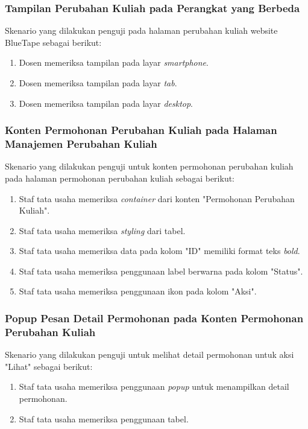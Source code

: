 \subsubsection{Tampilan Perubahan Kuliah pada Perangkat yang Berbeda}
Skenario yang dilakukan penguji pada halaman perubahan kuliah website BlueTape sebagai berikut:
\begin{enumerate}
	\item Dosen memeriksa tampilan pada layar \textit{smartphone}. 	
	\item Dosen memeriksa tampilan pada layar \textit{tab}.
	\item Dosen memeriksa tampilan pada layar \textit{desktop}.
\end{enumerate}

\subsubsection{Konten Permohonan Perubahan Kuliah pada Halaman Manajemen Perubahan Kuliah}
Skenario yang dilakukan penguji untuk konten permohonan perubahan kuliah pada halaman permohonan perubahan kuliah sebagai berikut:
\begin{enumerate}
	\item Staf tata usaha memeriksa \textit{container} dari konten "Permohonan Perubahan Kuliah".
	\item Staf tata usaha memeriksa \textit{styling} dari tabel.	
	\item Staf tata usaha memeriksa data pada kolom "ID" memiliki format teks \textit{bold}.
	\item Staf tata usaha memeriksa penggunaan label berwarna pada kolom "Status".			
	\item Staf tata usaha memeriksa penggunaan ikon pada kolom "Aksi".
\end{enumerate}

\subsubsection{Popup Pesan Detail Permohonan pada Konten Permohonan Perubahan Kuliah}
Skenario yang dilakukan penguji untuk melihat detail permohonan untuk aksi "Lihat" sebagai berikut:
\begin{enumerate}
	\item Staf tata usaha memeriksa penggunaan \textit{popup} untuk menampilkan detail permohonan.	
	\item Staf tata usaha memeriksa penggunaan tabel.	
\end{enumerate}

